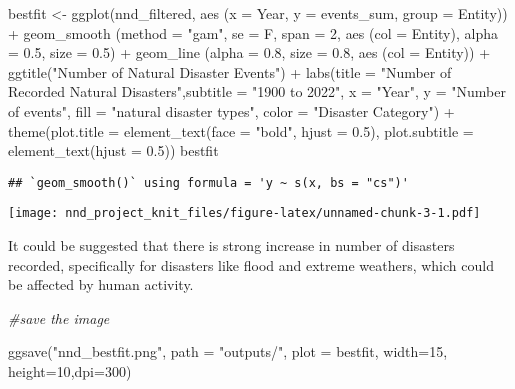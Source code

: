 \documentclass[
]{article}
\newenvironment{Shaded}{\begin{snugshade}}{\end{snugshade}}
\newcommand{\AttributeTok}[1]{\textcolor[rgb]{0.77,0.63,0.00}{#1}}
\newcommand{\CommentTok}[1]{\textcolor[rgb]{0.56,0.35,0.01}{\textit{#1}}}
\newcommand{\DecValTok}[1]{\textcolor[rgb]{0.00,0.00,0.81}{#1}}
\newcommand{\FloatTok}[1]{\textcolor[rgb]{0.00,0.00,0.81}{#1}}
\newcommand{\FunctionTok}[1]{\textcolor[rgb]{0.00,0.00,0.00}{#1}}
\newcommand{\NormalTok}[1]{#1}
\newcommand{\OtherTok}[1]{\textcolor[rgb]{0.56,0.35,0.01}{#1}}
\newcommand{\SpecialCharTok}[1]{\textcolor[rgb]{0.00,0.00,0.00}{#1}}
\newcommand{\StringTok}[1]{\textcolor[rgb]{0.31,0.60,0.02}{#1}}
\begin{document}
\begin{Shaded}
\begin{Highlighting}[]
\NormalTok{bestfit }\OtherTok{\textless{}{-}} \FunctionTok{ggplot}\NormalTok{(nnd\_filtered, }\FunctionTok{aes}\NormalTok{ (}\AttributeTok{x =}\NormalTok{ Year, }\AttributeTok{y =}\NormalTok{ events\_sum, }\AttributeTok{group =}\NormalTok{ Entity)) }\SpecialCharTok{+} 
  \FunctionTok{geom\_smooth}\NormalTok{ (}\AttributeTok{method =} \StringTok{"gam"}\NormalTok{, }\AttributeTok{se =}\NormalTok{ F, }\AttributeTok{span =} \DecValTok{2}\NormalTok{, }\FunctionTok{aes}\NormalTok{ (}\AttributeTok{col =}\NormalTok{ Entity), }\AttributeTok{alpha =} \FloatTok{0.5}\NormalTok{, }\AttributeTok{size =} \FloatTok{0.5}\NormalTok{) }\SpecialCharTok{+} 
  \FunctionTok{geom\_line}\NormalTok{ (}\AttributeTok{alpha =} \FloatTok{0.8}\NormalTok{, }\AttributeTok{size =} \FloatTok{0.8}\NormalTok{, }\FunctionTok{aes}\NormalTok{ (}\AttributeTok{col =}\NormalTok{ Entity))  }\SpecialCharTok{+} 
  \FunctionTok{ggtitle}\NormalTok{(}\StringTok{"Number of Natural Disaster Events"}\NormalTok{) }\SpecialCharTok{+}
  \FunctionTok{labs}\NormalTok{(}\AttributeTok{title =} \StringTok{"Number of Recorded Natural Disasters"}\NormalTok{,}\AttributeTok{subtitle =} \StringTok{"1900 to 2022"}\NormalTok{, }
       \AttributeTok{x =} \StringTok{"Year"}\NormalTok{, }\AttributeTok{y =} \StringTok{"Number of events"}\NormalTok{, }
       \AttributeTok{fill =} \StringTok{"natural disaster types"}\NormalTok{, }\AttributeTok{color =} \StringTok{"Disaster Category"}\NormalTok{) }\SpecialCharTok{+}
  \FunctionTok{theme}\NormalTok{(}\AttributeTok{plot.title =} \FunctionTok{element\_text}\NormalTok{(}\AttributeTok{face =} \StringTok{"bold"}\NormalTok{, }\AttributeTok{hjust =} \FloatTok{0.5}\NormalTok{), }\AttributeTok{plot.subtitle =} \FunctionTok{element\_text}\NormalTok{(}\AttributeTok{hjust =} \FloatTok{0.5}\NormalTok{))}
\NormalTok{bestfit}
\end{Highlighting}
\end{Shaded}

\begin{verbatim}
## `geom_smooth()` using formula = 'y ~ s(x, bs = "cs")'
\end{verbatim}

\texttt{[image: nnd\_project\_knit\_files/figure-latex/unnamed-chunk-3-1.pdf]}

It could be suggested that there is strong increase in number of
disasters recorded, specifically for disasters like flood and extreme
weathers, which could be affected by human activity.

\begin{Shaded}
\begin{Highlighting}[]
\CommentTok{\#save the image}

\FunctionTok{ggsave}\NormalTok{(}\StringTok{"nnd\_bestfit.png"}\NormalTok{, }\AttributeTok{path =} \StringTok{"outputs/"}\NormalTok{, }\AttributeTok{plot =}\NormalTok{ bestfit, }\AttributeTok{width=}\DecValTok{15}\NormalTok{, }\AttributeTok{height=}\DecValTok{10}\NormalTok{,}\AttributeTok{dpi=}\DecValTok{300}\NormalTok{)}
\end{Highlighting}
\end{Shaded}
\end{document}
